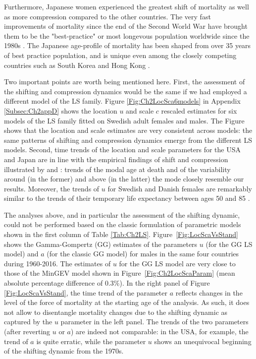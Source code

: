 \documentclass[Thesis]{subfiles}
\begin{document}
Furthermore, Japanese women experienced the greatest shift of mortality as well as more compression compared to the other countries. The very fast improvements of mortality since the end of the Second World War have brought them to be the "best-practice" or most longevous population worldwide since the 1980s \cite[see][Fig.~2]{oeppen2002broken}. The Japanese age-profile of mortality has been shaped from over 35 years of best practice population, and is unique even among the closely competing countries such as South Korea and Hong Kong \citep{vallin2016highest,kontis2017future}.

Two important points are worth being mentioned here. First, the assessment of the shifting and compression dynamics would be the same if we had employed a different model of the LS family. Figure \ref{Fig:Ch2LocSca6models} in Appendix \ref{Subsec:Ch2appD} shows the location $u$ and scale $c$ rescaled estimates for six models of the LS family fitted on Swedish adult females and males. The Figure shows that the location and scale estimates are very consistent across models: the same patterns of shifting and compression dynamics emerge from the different LS models. Second, time trends of the location and scale parameters for the USA and Japan are in line with the empirical findings of shift and compression illustrated by \cite{canudas2008modal} and \cite{ouellette2011changes}: trends of the modal age at death and of the variability around (in the former) and above (in the latter) the mode closely resemble our results. Moreover, the trends of $u$ for Swedish and Danish females are remarkably similar to the trends of their temporary life expectancy between ages 50 and 85 \cite[see][Fig.~1(a)]{lindahl2016did}.

The analyses above, and in particular the assessment of the shifting dynamic, could not be performed based on the classic formulation of parametric models shown in the first column of Table \ref{Tab:Ch2LS}. Figure~\ref{Fig:LocScaVsStand} shows the Gamma-Gompertz (GG) estimates of the parameters $u$ (for the GG LS model) and $a$ (for the classic GG model) for males in the same four countries during 1960-2016. The estimates of $u$ for the GG LS model are very close to those of the MinGEV model shown in Figure~\ref{Fig:Ch2LocScaParam} (mean absolute percentage difference of 0.3\%). In the right panel of Figure \ref{Fig:LocScaVsStand}, the time trend of the parameter $a$ reflects changes in the level of the force of mortality at the starting age of the analysis. As such, it does not allow to disentangle mortality changes due to the shifting dynamic as captured by the $u$ parameter in the left panel. The trends of the two parameters (after reverting $u$ or $a$) are indeed not comparable: in the USA, for example, the trend of $a$ is quite erratic, while the parameter $u$ shows an unequivocal beginning of the shifting dynamic from the 1970s.  
\end{document}
